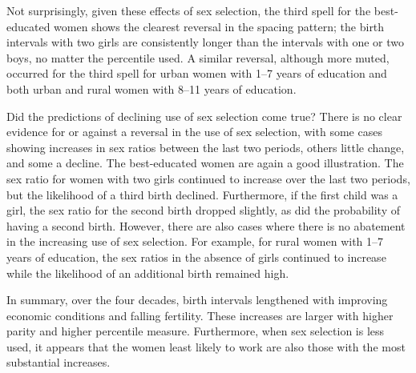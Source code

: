 \documentclass[12pt,letterpaper]{article}
\begin{document}
Not surprisingly, given these effects of sex selection, the third spell for the 
best-educated women shows the clearest reversal in the spacing pattern; 
the birth intervals with two girls are consistently longer than the intervals with one or 
two boys, no matter the percentile used.
A similar reversal, although more muted, occurred for the third spell for urban women 
with 1--7 years of education and both urban and rural women with 8--11 years of 
education.




Did the predictions of declining use of sex selection come true? 
There is no clear evidence for or against a reversal in the use of sex selection, with 
some cases showing increases in sex ratios between the last two periods, others little 
change, and some a decline. 
The best-educated women are again a good illustration. 
The sex ratio for women with two girls continued to increase over the last two periods, 
but the likelihood of a third birth declined. 
Furthermore, if the first child was a girl, the sex ratio for the second birth dropped 
slightly, as did the probability of having a second birth. 
However, there are also cases where there is no abatement in the increasing use of sex 
selection. 
For example, for rural women with 1--7 years of education, the sex ratios in the 
absence of girls continued to increase while the likelihood of an additional birth remained 
high.


In summary, over the four decades, birth intervals lengthened with improving economic 
conditions and falling fertility. 
These increases are larger with higher parity and higher percentile measure. 
Furthermore, when sex selection is less used, it appears that the women least likely to 
work are also those with the most substantial increases.
\end{document}
